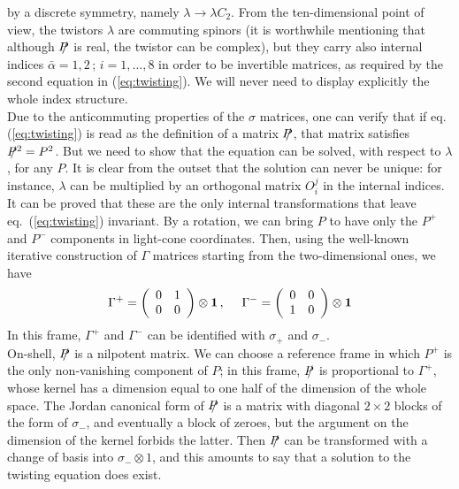 \documentclass[a4paper,12pt]{article}
\begin{document}
by a discrete symmetry, namely $\lambda \to \lambda C_2$.  From the
ten-dimensional point of view, the twistors $\lambda$ are commuting
spinors (it is worthwhile mentioning that although $\SL{P}$ is
real, the twistor can be complex), but they carry also internal
indices $\bar\alpha = 1,2 \, ; \, i= 1 , \ldots, 8$ in order to be
invertible matrices, as required by the second equation in
(\ref{eq:twisting}). We will never
need to display explicitly the whole index structure. \\
%
Due to the anticommuting properties of the $\sigma$ matrices, one can
verify that if eq.~ (\ref{eq:twisting}) is read as the definition
of a matrix $\SL{P}$, that matrix satisfies $\SL{P}^2 = P^2$.  But we
need to show that the equation can be solved, with respect to
$\lambda$, for any $P$. It is clear from the outset that the solution
can never be unique: for instance, $\lambda$ can be multiplied by an
orthogonal matrix $O_i^j$ in the internal indices. It can be proved
that these are the only internal transformations that leave
eq.~(\ref{eq:twisting}) invariant. By a rotation,
we can bring $P$ to have only the $P^+$ and $P^-$ components in
light-cone coordinates.  Then, using the well-known iterative
construction of $\Gamma$ matrices starting from the two-dimensional
ones, we have
\begin{eqnarray*}
\Gamma^+ = \left( \begin{array}{cc} 0 & 1 \\ 0 & 0 \end{array}
\right) \otimes  {\bf 1} \, , ~~~~
\Gamma^- = \left( \begin{array}{cc} 0 & 0 \\ 1 & 0 \end{array}
\right) \otimes  {\bf 1}
\end{eqnarray*} 
In this frame, $\Gamma^+$ and $\Gamma^-$ can be identified with $\sigma_+$
and $\sigma_-$.  \\
On-shell, $\SL{P}$ is a nilpotent matrix. We can choose a reference
frame in which $P^+$ is the only non-vanishing component of $P$; in  
this frame, $\SL{P}$ is proportional to $\Gamma^+$, whose kernel has a
dimension equal to one half of the dimension of the whole space.
The Jordan canonical form of $\SL{P}$ is a matrix with diagonal
$2\times 2$ blocks 
of the form of $\sigma_-$, and eventually a block of zeroes, but the
argument on the dimension of the kernel forbids the latter.
Then $\SL{P}$ can be transformed with a change of basis into
$\sigma_- \otimes 1 $, and this amounts to say that a 
solution to the twisting equation does exist. \\
\end{document}
